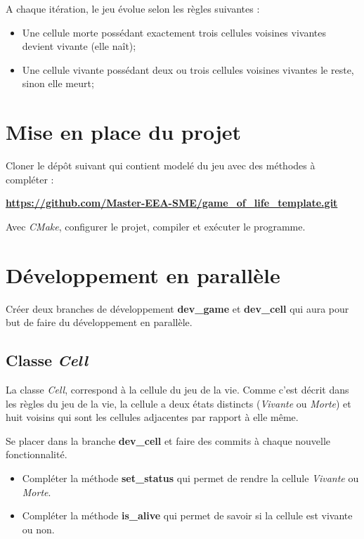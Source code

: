 \medskip

A chaque itération, le jeu évolue selon les règles suivantes :

\medskip

\begin{itemize}
    \item Une cellule morte possédant exactement trois cellules voisines vivantes devient vivante (elle naît);
    \medskip
    \item Une cellule vivante possédant deux ou trois cellules voisines vivantes le reste, sinon elle meurt;
\end{itemize}

\section{Mise en place du projet}
Cloner le dépôt suivant qui contient modelé du jeu avec des méthodes à compléter : 

\begin{center}
    \textbf{\href{https://github.com/Master-EEA-SME/game\_of\_life\_template.git}{https://github.com/Master-EEA-SME/game\_of\_life\_template.git}}
\end{center}

Avec \textit{CMake}, configurer le projet, compiler et exécuter le programme.

\section{Développement en parallèle}
Créer deux branches de développement \textbf{dev\_game} et \textbf{dev\_cell} qui aura pour but de faire du développement en parallèle. 

\subsection{Classe \textit{Cell}}
La classe \textit{Cell}, correspond à la cellule du jeu de la vie. Comme c'est décrit dans les règles du jeu de la vie, la cellule a deux états distincts (\textit{Vivante} ou \textit{Morte}) et huit voisins qui sont les cellules adjacentes par rapport à elle même.

\medskip

Se placer dans la branche \textbf{dev\_cell} et faire des commits à chaque nouvelle fonctionnalité.

\medskip

\begin{itemize}
    \item Compléter la méthode \textbf{set\_status} qui permet de rendre la cellule \textit{Vivante} ou \textit{Morte}.
    \medskip
    \item Compléter la méthode \textbf{is\_alive} qui permet de savoir si la cellule est vivante ou non.
\end{itemize}

